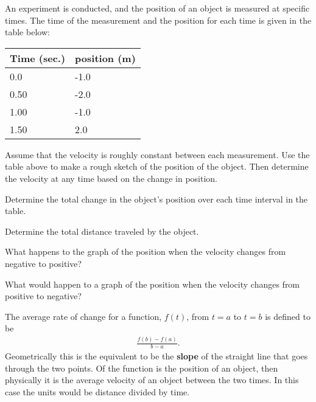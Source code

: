 
\begin{problem}

\item An experiment is conducted, and the position of an object is
  measured at specific times. The time of the measurement and the
  position for each time is given in the table below: \\
  \begin{tabular}{l|l}
    Time (sec.) & position (m) \\ \hline
    0.0  & -1.0 \\
    0.50 & -2.0 \\
    1.00 & -1.0 \\
    1.50 &  2.0
  \end{tabular}
  \begin{subproblem}
  \item Assume that the velocity is roughly constant between each
    measurement. Use the table above to make a rough sketch of the
    position of the object. Then determine the velocity at any time
    based on the change in position.

    \scalebox{0.7}{}

    
    \clearpage

  \item Determine the total change in the object's position over each
    time interval in the table.

      \vfill

  \item Determine the total distance traveled by the object.

    \vfill

  \item What happens to the graph of the position when the velocity
    changes from negative to positive?
    \vspace{4em}

  \item What would happen to a graph of the position when the velocity
    changes from positive to negative?  
    \vspace{4em}

  \end{subproblem}


\clearpage 

The average rate of change for a function, $f(t)$, from $t=a$ to $t=b$ is
defined to be 
\begin{eqnarray*}
  \frac{f(b)-f(a)}{b-a}.
\end{eqnarray*}
Geometrically this is the equivalent to be the \textbf{slope} of the
straight line that goes through the two points. Of the function is the
position of an object, then physically it is the average velocity of
an object between the two times. In this case the units would be
distance divided by time.


\end{problem}
